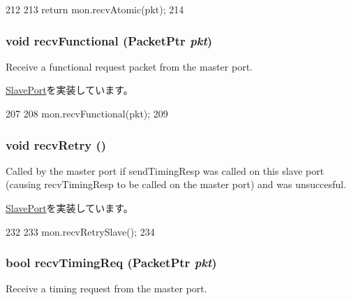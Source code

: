 \begin{DoxyCode}
212         {
213             return mon.recvAtomic(pkt);
214         }
\end{DoxyCode}
\hypertarget{classCommMonitor_1_1MonitorSlavePort_aeefa907fb6d6a787e6dab90e8138ea90}{
\subsubsection[{recvFunctional}]{\setlength{\rightskip}{0pt plus 5cm}void recvFunctional ({\bf PacketPtr} {\em pkt})}}
\label{classCommMonitor_1_1MonitorSlavePort_aeefa907fb6d6a787e6dab90e8138ea90}
Receive a functional request packet from the master port. 

\hyperlink{classSlavePort_a6a3d6f2e5dab6bed16d53d9e7c17378d}{SlavePort}を実装しています。


\begin{DoxyCode}
207         {
208             mon.recvFunctional(pkt);
209         }
\end{DoxyCode}
\hypertarget{classCommMonitor_1_1MonitorSlavePort_a29cb5a4f98063ce6e9210eacbdb35298}{
\subsubsection[{recvRetry}]{\setlength{\rightskip}{0pt plus 5cm}void recvRetry ()}}
\label{classCommMonitor_1_1MonitorSlavePort_a29cb5a4f98063ce6e9210eacbdb35298}
Called by the master port if sendTimingResp was called on this slave port (causing recvTimingResp to be called on the master port) and was unsuccesful. 

\hyperlink{classSlavePort_ac1ccc3bcf7ebabb20b57fab99b2be5b0}{SlavePort}を実装しています。


\begin{DoxyCode}
232         {
233             mon.recvRetrySlave();
234         }
\end{DoxyCode}
\hypertarget{classCommMonitor_1_1MonitorSlavePort_a3344d9dd0f83257feab5424e761f31c6}{
\subsubsection[{recvTimingReq}]{\setlength{\rightskip}{0pt plus 5cm}bool recvTimingReq ({\bf PacketPtr} {\em pkt})}}
\label{classCommMonitor_1_1MonitorSlavePort_a3344d9dd0f83257feab5424e761f31c6}
Receive a timing request from the master port. 

